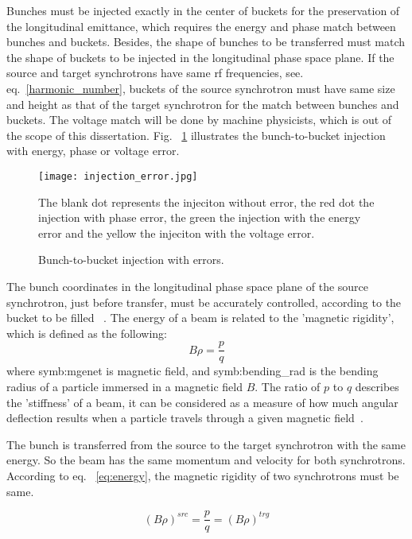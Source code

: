Bunches must be injected exactly in the center of buckets for the preservation of the longitudinal emittance, which requires the energy and phase match between bunches and buckets. Besides, the shape of bunches to be transferred must match the shape of buckets to be injected in the longitudinal phase space plane. If the source and target synchrotrons have same rf frequencies, see. eq.~\ref{harmonic_number}, buckets of the source synchrotron must have same size and height as that of the target synchrotron for the match between bunches and buckets. The voltage match will be done by machine physicists, which is out of the scope of this dissertation. Fig. ~\ref{injection_error} illustrates the bunch-to-bucket injection with energy, phase or voltage error. 
\begin{figure}[!htb]
   \centering   
   \texttt{[image: injection\_error.jpg]}
   \caption{Bunch-to-bucket injection with errors.}{The blank dot represents the injeciton without error, the red dot the injection with phase error, the green the injection with the energy error and the yellow the injeciton with the voltage error.}
   \label{injection_error}
\end{figure} 

The bunch coordinates in the longitudinal phase space plane of the source synchrotron, just before transfer, must be accurately controlled, according to the bucket to be filled ~\cite{garoby_timing_1984}. The energy of a beam is related to the 'magnetic rigidity', which is defined as the following:
\begin{equation}
	\label{eq:energy}
	B\rho =\frac{p}{q}
\end{equation}
where \gls{symb:mgenet} is magnetic field, and \gls{symb:bending_rad} is the bending radius of a particle immersed in a magnetic field $B$. The ratio of $p$ to $q$ describes the 'stiffness’ of a beam, it can be considered as a measure of how much angular deflection results when a particle travels through a given magnetic field~\cite{barletta_overview_????}.

The bunch is transferred from the source to the target synchrotron with the same energy. So the beam has the same momentum and velocity for both synchrotrons. According to eq. ~\ref{eq:energy}, the magnetic rigidity of two synchrotrons must be same.

\begin{equation}
	\label{eq:rigidity}
	(B\rho)^{\mathit{src}} =\frac{p}{q}=(B\rho)^{\mathit{trg}}
\end{equation}

